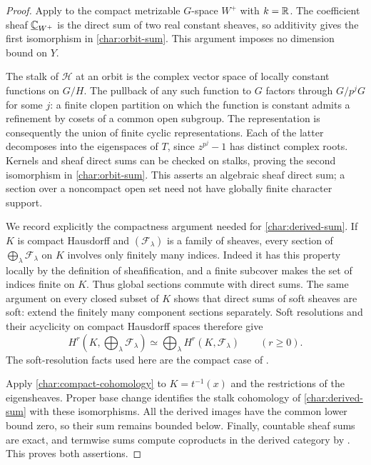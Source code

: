 \begin{proof}
Apply  to the compact metrizable
$G$-space $W^+$ with $k=\mathbb R$.  The coefficient sheaf
$\underline{\mathbb C}_{W^+}$ is the direct sum of two real constant sheaves,
so additivity gives the first isomorphism in \eqref{char:orbit-sum}.
This argument imposes no dimension bound on $Y$.

The stalk of $\mathcal H$ at an orbit is the complex vector space of
locally constant functions on $G/H$.  The pullback of any such function
to $G$ factors through $G/p^jG$ for some $j$: a finite clopen partition
on which the function is constant admits a refinement by cosets of a
common open subgroup.  The representation is consequently the union
of finite cyclic representations.  Each of the latter decomposes into
the eigenspaces of $T$, since $z^{p^j}-1$ has distinct complex roots.
Kernels and sheaf direct sums can be checked on stalks, proving the
second isomorphism in \eqref{char:orbit-sum}.  This asserts an algebraic
sheaf direct sum; a section over a noncompact open set need not have
globally finite character support.

We record explicitly the compactness argument needed for
\eqref{char:derived-sum}.  If $K$ is compact Hausdorff and
$(\mathcal F_\lambda)$ is a family of sheaves, every section of
$\bigoplus_\lambda\mathcal F_\lambda$ on $K$ involves only finitely many
indices.  Indeed it has this property locally by the definition of
sheafification, and a finite subcover makes the set of indices finite
on $K$.  Thus global sections commute with direct sums.  The same
argument on every closed subset of $K$ shows that direct sums of soft
sheaves are soft: extend the finitely many component sections
separately.  Soft resolutions and their acyclicity on compact Hausdorff
spaces therefore give
\begin{equation}\label{char:compact-cohomology}
 H^r\!\left(K,\bigoplus_\lambda\mathcal F_\lambda\right)
       \simeq\bigoplus_\lambda H^r(K,\mathcal F_\lambda)
 \qquad(r\geq0).
\end{equation}
The soft-resolution facts used here are the compact case of
\cite[Propositions~11.2.4, 11.2.5, and~11.2.8]{SchapiraNotes}.

Apply \eqref{char:compact-cohomology} to $K=t^{-1}(x)$ and the
restrictions of the eigensheaves.  Proper base change identifies the
stalk cohomology of \eqref{char:derived-sum} with these isomorphisms.
All the derived images have the common lower bound zero, so their sum
remains bounded below.  Finally, countable sheaf sums are exact, and
termwise sums compute coproducts in the derived category by
\cite[Lemma~13.33.5]{StacksDerivedSums}.  This proves both assertions.
\end{proof}

